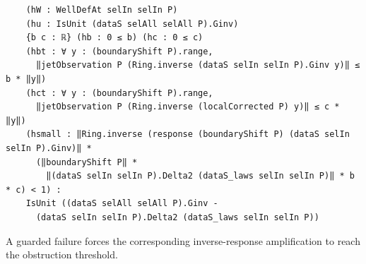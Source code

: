 \begin{theorem}[bp-042]
\begin{verbatim}
    (hW : WellDefAt selIn selIn P)
    (hu : IsUnit (dataS selAll selAll P).Ginv)
    {b c : ℝ} (hb : 0 ≤ b) (hc : 0 ≤ c)
    (hbt : ∀ y : (boundaryShift P).range,
      ‖jetObservation P (Ring.inverse (dataS selIn selIn P).Ginv y)‖ ≤ b * ‖y‖)
    (hct : ∀ y : (boundaryShift P).range,
      ‖jetObservation P (Ring.inverse (localCorrected P) y)‖ ≤ c * ‖y‖)
    (hsmall : ‖Ring.inverse (response (boundaryShift P) (dataS selIn selIn P).Ginv)‖ *
      (‖boundaryShift P‖ *
        ‖(dataS selIn selIn P).Delta2 (dataS_laws selIn selIn P)‖ * b * c) < 1) :
    IsUnit ((dataS selAll selAll P).Ginv -
      (dataS selIn selIn P).Delta2 (dataS_laws selIn selIn P))
\end{verbatim}
\end{theorem}

\begin{theorem}[bp-043]
\label{bp-043}
\leanok
A guarded failure forces the corresponding inverse-response amplification to reach the obstruction threshold.


\end{theorem}
